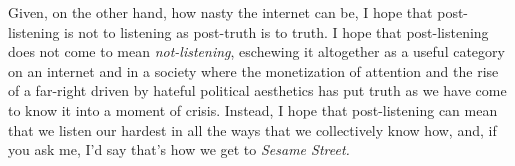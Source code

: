 \documentclass[12pt,letterpaper]{article}
\begin{document}
	Given, on the other hand, how nasty the internet can be, I hope that 
	post-listening is not to listening as post-truth is to truth. I hope
	that
	post-listening does not come to mean \textit{not-listening}, eschewing 
	it	
	altogether as a useful category on an internet and in a society where 
	the monetization of attention and the rise of a far-right driven by 
	hateful political aesthetics has put truth as we have come to know it 
	into a moment of crisis. Instead, I hope that post-listening can mean 
	that we listen our hardest in all the ways that we collectively know 
	how, and, if you ask me, I'd say that's how we get to \textit{Sesame 
	Street.} 

\newpage
\singlespacing
\printbibliography
\end{document}
